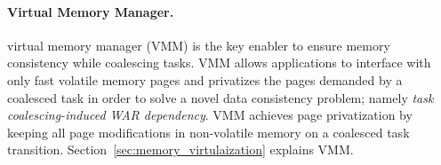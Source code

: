 \paragraph{Virtual Memory Manager.}
\sys virtual memory manager (VMM) is the key enabler to ensure memory consistency while coalescing tasks. VMM allows applications to interface with only fast volatile memory pages and privatizes the pages demanded by a coalesced task in order to solve a novel data consistency problem; namely \emph{task coalescing-induced WAR dependency}. VMM achieves page privatization by keeping all page modifications in non-volatile memory on a coalesced task transition. Section~\ref{sec:memory_virtulaization} explains VMM.

